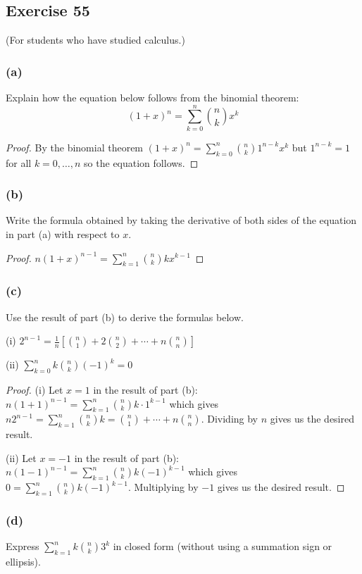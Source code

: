 \documentclass[14pt]{extarticle}
\newcommand{\dps}{\displaystyle}
\begin{document}
\subsection{Exercise 55}
(For students who have studied calculus.)

\subsubsection{(a)}
Explain how the equation below follows from the binomial theorem: 
\[
(1+x)^n = \sum_{k=0}^{n} \binom{n}{k} x^k
\]
\begin{proof}
By the binomial theorem \((1+x)^n = \sum_{k=0}^{n} \binom{n}{k} 1^{n-k}x^k\) but \(1^{n-k}=1\) for all \(k= 0, \ldots, n\)
so the equation follows.
\end{proof}

\subsubsection{(b)}
Write the formula obtained by taking the derivative of both sides of the equation in part (a) with respect to \(x\).

\begin{proof}
\(n(1+x)^{n-1} = \sum_{k=1}^n \binom{n}{k}kx^{k-1}\)
\end{proof}

\subsubsection{(c)}
Use the result of part (b) to derive the formulas below.

(i) \(\dps 2^{n-1} = \frac{1}{n}\left[\binom{n}{1} + 2\binom{n}{2} + \cdots + n\binom{n}{n}\right]\)

(ii) \(\dps \sum_{k=0}^{n} k \binom{n}{k} (-1)^k = 0\)

\begin{proof}
(i) Let \(x = 1\) in the result of part (b): \(n(1+1)^{n-1} = \sum_{k=1}^n \binom{n}{k}k \cdot 1^{k-1}\) which gives 
\(n2^{n-1} = \sum_{k=1}^n \binom{n}{k}k = \binom{n}{1} + \cdots + n\binom{n}{n}\). Dividing by \(n\) gives us the 
desired result.

(ii) Let \(x = -1\) in the result of part (b): \(n(1-1)^{n-1} = \sum_{k=1}^n \binom{n}{k}k (-1)^{k-1}\) which gives 
\(0 = \sum_{k=1}^n \binom{n}{k}k (-1)^{k-1}\). Multiplying by \(-1\) gives us the desired result.
\end{proof}

\subsubsection{(d)}
Express \(\dps \sum_{k=1}^{n} k \binom{n}{k} 3^k\) in closed form (without using a summation sign or ellipsis).
\end{document}
